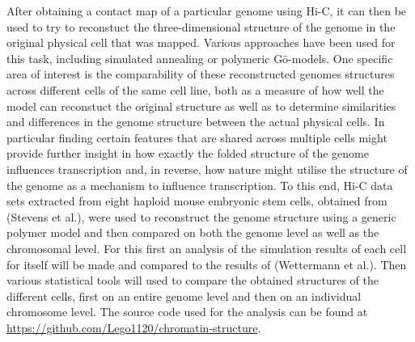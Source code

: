 \documentclass[a4paper,11pt,oneside,final,english,toc=bib]{scrbook}
\begin{document}
After obtaining a contact map of a particular genome using Hi-C, it can then be used to try to reconstuct the three-dimensional structure of the genome in the original physical cell that was mapped. Various approaches have been used for this task, including simulated annealing\cite{stevens_3d_2017} or polymeric Gō-models\cite{wettermann_minimal_2020}. One specific area of interest is the comparability of these reconstructed genomes structures across different cells of the same cell line, both as a measure of how well the model can reconstuct the original structure as well as to determine similarities and differences in the genome structure between the actual physical cells. In particular finding certain features that are shared across multiple cells might provide further insight in how exactly the folded structure of the genome influences transcription and, in reverse, how nature might utilise the structure of the genome as a mechanism to influence transcription. To this end, Hi-C data sets extracted from eight haploid mouse embryonic stem cells, obtained from (Stevens et al.\cite{stevens_3d_2017}), were used to reconstruct the genome structure using a generic polymer model and then compared on both the genome level as well as the chromosomal level. For this first an analysis of the simulation results of each cell for itself will be made and compared to the results of (Wettermann et al.\cite{wettermann_minimal_2020}). Then various statistical tools will used to compare the obtained structures of the different cells, first on an entire genome level and then on an individual chromosome level. The source code used for the analysis can be found at \url{https://github.com/Lego1120/chromatin-structure}.




\end{document}
